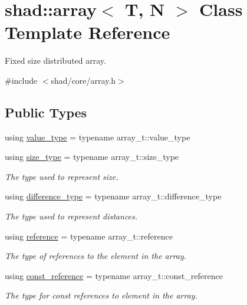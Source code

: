 \hypertarget{classshad_1_1array}{\section{shad\-:\-:array$<$ T, N $>$ Class Template Reference}
\label{classshad_1_1array}
}


Fixed size distributed array.  




{\ttfamily \#include $<$shad/core/array.\-h$>$}

\subsection*{Public Types}
\begin{DoxyCompactItemize}
\item 
using \hyperlink{group__Types_gaf417752888d4f1e19286503579310a52}{value\-\_\-type} = typename array\-\_\-t\-::value\-\_\-type
\item 
using \hyperlink{group__Types_ga037c76c91958f47f53bfebad4d67f8bb}{size\-\_\-type} = typename array\-\_\-t\-::size\-\_\-type
\begin{DoxyCompactList}\small\item\em The type used to represent size. \end{DoxyCompactList}\item 
using \hyperlink{group__Types_ga588f85dc2eccfd3b3a1a6229d4cfd04a}{difference\-\_\-type} = typename array\-\_\-t\-::difference\-\_\-type
\begin{DoxyCompactList}\small\item\em The type used to represent distances. \end{DoxyCompactList}\item 
using \hyperlink{group__Types_gad3f7e8f8130d2cfb3b554c72f9f29c57}{reference} = typename array\-\_\-t\-::reference
\begin{DoxyCompactList}\small\item\em The type of references to the element in the array. \end{DoxyCompactList}\item 
using \hyperlink{group__Types_gaac06273bdbb48ad582528e12e76bd859}{const\-\_\-reference} = typename array\-\_\-t\-::const\-\_\-reference
\begin{DoxyCompactList}\small\item\em The type for const references to element in the array. \end{DoxyCompactList}\item 

\end{DoxyCompactItemize}
